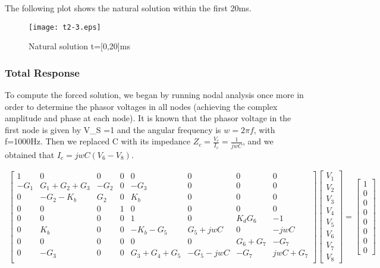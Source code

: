 The following plot shows the natural solution within the first 20ms.
\begin{figure}[h] \centering
\texttt{[image: t2-3.eps]}
\caption{Natural solution t=[0,20]ms}
\label{fig:natural}
\end{figure}

\subsubsection{Total Response}

To compute the forced solution, we began by running nodal analysis once more in order to determine the phasor voltages in all nodes (achieving the complex amplitude and phase at each node). It is known that the phasor voltage in the first node is given by V_S =1 and the angular frequency is $w=2\pi f$, with f=1000Hz. Then we replaced C with its impedance $Z_c= \frac{V_c}{I_c}=\frac{1}{jwC}$, and we obtained that $I_c=jwC(V_6-V_8)$.

\begin{gather}
\begin{bmatrix}
1 & 0 & 0 & 0 & 0 & 0 & 0 & 0\\
-G_1 & G_1+G_2+G_3 & -G_2& 0 & -G_3 & 0 & 0 & 0\\
0 & -G_2-K_b & G_2 & 0 & K_b & 0 & 0 & 0\\
0 & 0 & 0 & 1 & 0 & 0 & 0 & 0\\
0 & 0 & 0 & 0 & 1 & 0 & K_d G_6 & -1\\
0 & K_b & 0 & 0 & -K_b-G_5 & G_5+jwC & 0 & -jwC\\
0 & 0 & 0 & 0 & 0 & 0 & G_6+G_7 & -G_7\\
0 & -G_3 & 0 & 0 & G_3+G_4+G_5 & -G_5-jwC & -G_7 & jwC+G_7\\
\end{bmatrix}
\begin{bmatrix}
 V_1\\
 V_2\\
 V_3\\
 V_4\\
 V_5\\
 V_6\\
 V_7\\
 V_8
\end{bmatrix}
=
\begin{bmatrix}
 1\\
 0\\
 0\\
 0\\
 0\\
 0\\
 0\\
 0
\end{bmatrix}
\end{gather}


